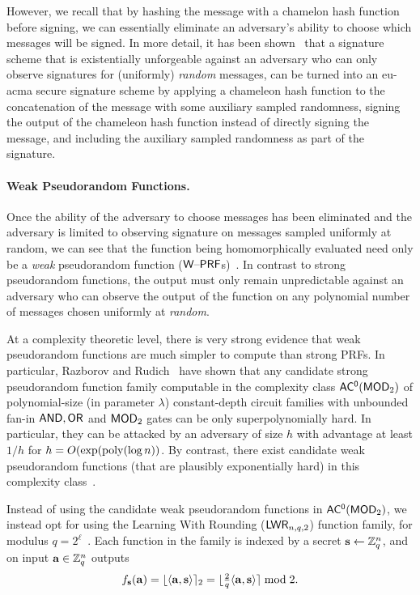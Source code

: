 However, we recall that by hashing the message with a chamelon hash function~\cite{DBLP:conf/ndss/KrawczykR00} before signing, we can essentially eliminate an adversary's ability to choose which messages will be signed. In more detail, it has  been shown~\cite{DBLP:conf/crypto/ShamirT01} that a signature scheme that is existentially unforgeable against an adversary who can only observe signatures for (uniformly) \emph{random} messages, can be turned into an eu-acma secure signature scheme by applying a chameleon hash function to the concatenation of the message with some auxiliary sampled randomness, signing the output of the chameleon hash function instead of directly signing the message, and including the auxiliary sampled randomness as part of the signature.

\paragraph{Weak Pseudorandom Functions.}
Once the ability of the adversary to choose messages has been eliminated and the adversary is limited to observing signature on messages sampled uniformly at random, we can see that the function being homomorphically evaluated need only be a \emph{weak} pseudorandom function ($\mathsf{W\text{\textendash}PRF}$s)~\cite{DBLP:conf/crypto/DamgardN02}. In contrast to strong pseudorandom functions, the output must only
remain unpredictable against an adversary who can observe the output of the function on any polynomial number of messages chosen uniformly at \emph{random}.

At a complexity theoretic level, there is very strong evidence that weak pseudorandom functions are much simpler to compute than strong PRFs. In particular, Razborov and Rudich~\cite{DBLP:conf/stoc/RazborovR94} have shown that any candidate strong pseudorandom function family computable in the complexity class $\mathsf{AC^{0}}(\mathsf{MOD}_2)$ of polynomial-size (in parameter $\lambda$) constant-depth circuit families with unbounded fan-in $\mathsf{AND},\mathsf{OR}$ and $\mathsf{MOD}_2$ gates can be only superpolynomially hard. In particular, they can be attacked by an adversary of size $h$ with advantage at least $1/h$ for $h=O(\exp(\operatorname{poly}(\log{n}))$. 
By contrast, there exist candidate weak pseudorandom functions (that are plausibly exponentially hard) in this complexity class~\cite{DBLP:conf/innovations/AkaviaBGKR14}.

Instead of using the candidate weak pseudorandom functions in $\mathsf{AC^{0}}(\mathsf{MOD}_2)$, we instead opt for using the Learning With Rounding ($\mathsf{LWR}_{n,q,2}$) function family, for modulus $q=2^{\ell}$~\cite{DBLP:conf/eurocrypt/BanerjeePR12}. Each function in the family is indexed by a secret $\mathbf{s} \gets \mathbb{Z}_q^n$, and on input $\mathbf{a} \in \mathbb{Z}_q^{n}$ outputs 
\[f_{\mathbf{s}}(\mathbf{a})=\lfloor\langle\mathbf{a},\mathbf{s}\rangle\rceil_{2}=\lfloor\tfrac{2}{q} \langle\mathbf{a},\mathbf{s}\rangle\rceil \bmod{2}.\]


